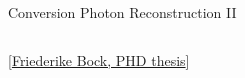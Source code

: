 \documentclass[aspectratio=169,10pt]{beamer}
\begin{document}
\begin{frame}{Conversion Photon Reconstruction II}
\begin{columns}
\begin{column}{6cm}
{\begin{figure}
          \end{figure}
         }
        \tiny \hspace{3.6cm} [\href{https://www.dropbox.com/s/a3c4ivz55mcbz5d/PHDThesis_SubmissionVersion_20171016.pdf?dl=0}{Friederike Bock, PHD thesis}]
      \end{column}
    \end{columns}
  \end{frame}
\end{document}
